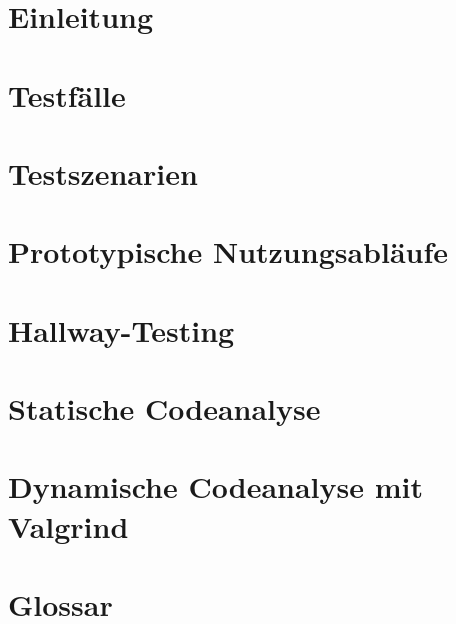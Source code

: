 

	
	\maketitle
	\setcounter{tocdepth}{1}
	\tableofcontents
	\chapter{Einleitung}
		
	\chapter{Testfälle}
		
	\chapter{Testszenarien}
		
	\chapter{Prototypische Nutzungsabläufe}
		
	\chapter{Hallway-Testing}
		
	\chapter{Statische Codeanalyse}
		
	\chapter{Dynamische Codeanalyse mit Valgrind}
		
	\chapter{Glossar}
		
